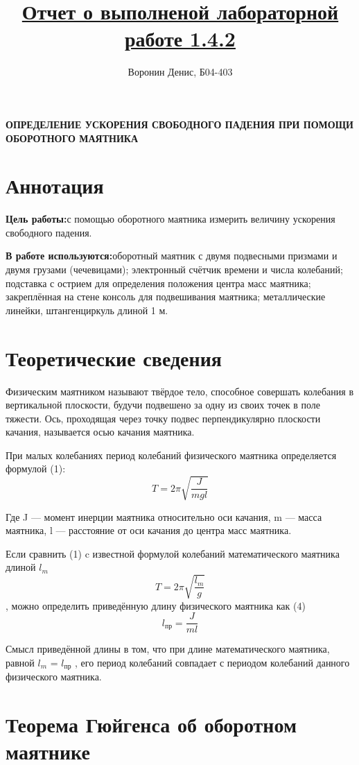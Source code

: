 \documentclass[a4paper]{article}
\title{\underline{Отчет о выполненой лабораторной работе 1.4.2}}
\author{Воронин Денис, Б04-403}
\begin{document}
\maketitle
\begin{center}
    \textbf{ОПРЕДЕЛЕНИЕ УСКОРЕНИЯ СВОБОДНОГО ПАДЕНИЯ ПРИ ПОМОЩИ ОБОРОТНОГО МАЯТНИКА}
\end{center}

\section{Аннотация}
\textbf{Цель работы:}с помощью оборотного маятника измерить величину ускорения свободного падения.

\textbf{В работе используются:}оборотный маятник с двумя подвесными призмами и 
двумя грузами (чечевицами); электронный счётчик времени и числа колебаний;
подставка с острием для определения положения центра масс маятника; закреплённая на стене консоль для подвешивания маятника; металлические линейки, штангенциркуль длиной 1 м.

\section{Теоретические сведения}
Физическим маятником называют твёрдое тело, способное совершать 
колебания в вертикальной плоскости, будучи подвешено за одну из своих 
точек в поле тяжести. Ось, проходящая через точку подвес перпендикулярно плоскости качания, называется осью качания маятника.\par
При малых колебаниях период колебаний физического маятника определяется формулой (1): \[T = 2\pi \sqrt{\frac{J}{mgl} } \] \par
Где J — момент инерции маятника относительно оси качания, m — масса 
маятника, l — расстояние от оси качания до центра масс маятника.\par
Если сравнить (1) c известной формулой колебаний математического 
маятника длиной ${l_{m}}$ \[T = 2\pi \sqrt{\frac{{l_{m}}}{g} }\] , можно определить приведённую длину физического маятника как (4)
\[l_{\text{пр}}=\frac{J}{ml}\]\par

Смысл приведённой длины в том, что при длине математического маятника, равной ${l_{m}}$ = $l_{\text{пр}}$ , его период колебаний совпадает с периодом колебаний данного физического маятника.

\section{Теорема Гюйгенса об оборотном маятнике}
\end{document}
